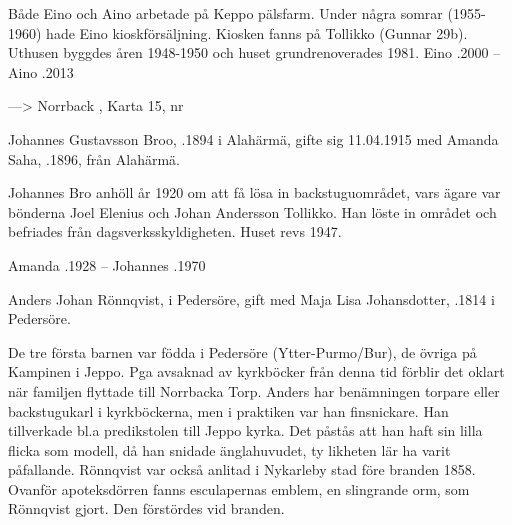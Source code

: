 Både Eino och Aino arbetade på Keppo pälsfarm. Under några somrar (1955-1960) hade Eino kioskförsäljning. Kiosken fanns på Tollikko (Gunnar 29b). Uthusen byggdes åren 1948-1950 och huset grundrenoverades 1981.
Eino .2000  --  Aino .2013




---> Norrback ,	Karta 15,  nr 


Johannes Gustavsson Broo, .1894 i Alahärmä, gifte sig 11.04.1915 med Amanda Saha, .1896,  från Alahärmä.
\begin{jhchildren}
  \item {}
  \item {}
  \item {}
  \item {}
\end{jhchildren}
Johannes Bro anhöll år 1920 om att få lösa in backstuguområdet, vars ägare var bönderna Joel Elenius och Johan Andersson Tollikko. Han löste in området och befriades från dagsverksskyldigheten. Huset revs 1947.

Amanda .1928  --  Johannes .1970


Anders Johan Rönnqvist,  i Pedersöre, gift med Maja Lisa Johansdotter, .1814 i Pedersöre.
\begin{jhchildren}
  \item {}
  \item {}
  \item {}
  \item {}
  \item {}
  \item {}
  \item {}
  \item {}
\end{jhchildren}
De tre första barnen var födda i Pedersöre (Ytter-Purmo/Bur), de övriga på Kampinen i Jeppo. Pga avsaknad av kyrkböcker från denna tid förblir det oklart när familjen flyttade till Norrbacka Torp. Anders har benämningen torpare eller backstugukarl i kyrkböckerna, men i praktiken var han finsnickare. Han tillverkade bl.a predikstolen till Jeppo kyrka. Det påstås att han haft sin lilla flicka som modell, då han snidade änglahuvudet, ty likheten lär ha varit påfallande. Rönnqvist var också anlitad i Nykarleby stad före branden 1858. Ovanför apoteksdörren fanns esculapernas emblem, en slingrande orm, som Rönnqvist gjort. Den förstördes vid branden.

